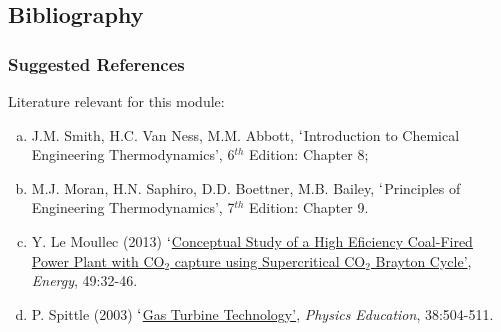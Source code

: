 \documentclass[10pt,compress]{beamer}
\begin{document}
\subsection{Bibliography} 
\begin{frame}
 \frametitle{Suggested References}
  Literature relevant for this module:
  \begin{enumerate}[(a)]
   \item J.M. Smith, H.C. Van Ness, M.M. Abbott, $\lq$Introduction to Chemical Engineering Thermodynamics', 6$^{th}$ Edition: Chapter 8;
   \item M.J. Moran, H.N. Saphiro, D.D. Boettner, M.B. Bailey, $\lq$Principles of Engineering Thermodynamics',  7$^{th}$ Edition: Chapter 9.
%
\item Y. Le Moullec (2013) \href{http://dx.doi.org/10.1016/j.energy.2012.10.022}{$\lq$Conceptual Study of a High Eficiency Coal-Fired Power Plant with CO$_{2}$ capture using Supercritical CO$_{2}$ Brayton Cycle'}, {\it Energy}, 49:32-46.
\item P. Spittle (2003) \href{http://dx.doi.org/10.1088/0031-9120/38/6/002}{$\lq$Gas Turbine Technology'}, {\it Physics Education}, 38:504-511.

  \end{enumerate}
\end{frame}
\end{document}
